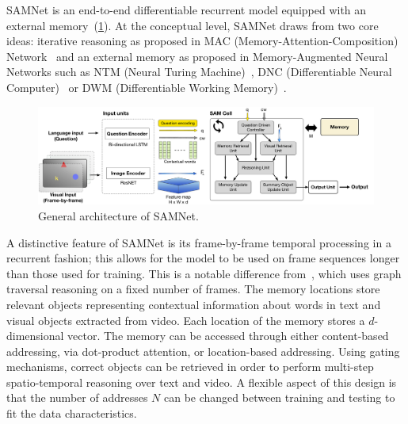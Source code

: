 SAMNet is an end-to-end differentiable recurrent model equipped with an external memory~(\cref{fig:samnet}). At the conceptual level, SAMNet draws from two core ideas:
iterative reasoning as proposed in MAC (Memory-Attention-Composition) Network~\cite{hudson2018compositional,marois2018transfer} and an external memory as proposed in Memory-Augmented Neural Networks such as NTM (Neural Turing Machine)~\cite{graves2014neural}, DNC (Differentiable Neural Computer)~\cite{graves2016hybrid} or DWM (Differentiable Working Memory)~\cite{jayram2018learning}.
\begin{figure}[!b]
	\centering
	\includegraphics[width=\textwidth]{../img/architecture/SAMNETmodel}
	\caption{General architecture of SAMNet.}
	\label{fig:samnet}
\end{figure}

A distinctive feature of SAMNet is its frame-by-frame temporal processing in a recurrent fashion; this allows for the model to be used on frame sequences longer than those used for training. This is a notable difference from~\cite{haurilet2019s}, which uses graph traversal reasoning on a fixed number of frames. 
The memory locations store relevant objects representing contextual information about words in text and visual objects extracted from video.
Each location of the memory stores a $d$-dimensional vector. %
The memory can be accessed through either content-based addressing, via dot-product attention, or location-based addressing. Using gating mechanisms, correct objects can be retrieved in order to perform multi-step spatio-temporal reasoning over text and video.
A flexible aspect of this design is that the number of addresses $N$ can be changed between training and testing to fit the data characteristics.


\smallskip

